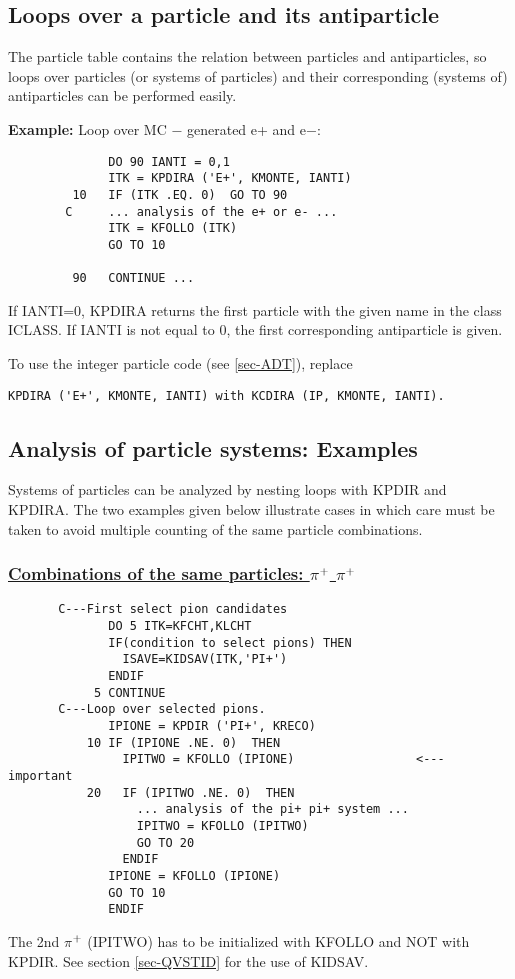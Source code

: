 \subsection{\label{sec-ADA}Loops over a particle and its antiparticle}
\par
The particle table contains the relation between particles and
antiparticles, so loops over particles (or systems of particles)
and their corresponding (systems of) antiparticles can be
performed easily.
\par
{\bf Example:} Loop over MC $-$ generated e+ and e$-$:
\begin{verbatim}
              DO 90 IANTI = 0,1
              ITK = KPDIRA ('E+', KMONTE, IANTI)
         10   IF (ITK .EQ. 0)  GO TO 90
        C     ... analysis of the e+ or e- ...
              ITK = KFOLLO (ITK)
              GO TO 10
 
         90   CONTINUE ...
\end{verbatim}
\begin{indentlist}{ 5.00cm}{ 5.25cm}
If IANTI=0, KPDIRA returns the first particle with the
given name in the class ICLASS.
If IANTI is not equal to 0, the first corresponding antiparticle
is given.
\end{indentlist}
To use the integer particle code (see \ref{sec-ADT}), replace
\begin{verbatim}
KPDIRA ('E+', KMONTE, IANTI) with KCDIRA (IP, KMONTE, IANTI).
\end{verbatim}
 
\subsection{\label{sec-ADS}Analysis of particle systems: Examples}
\par
Systems of particles can be analyzed by nesting loops with
KPDIR and KPDIRA. The two examples given below illustrate
cases in which care must be taken to avoid multiple counting of the
same
particle combinations.
 
\subsubsection{\underline {Combinations of the same particles: $\pi$$\sp{+}$
$\pi$$\sp{+}$}}
\par
\begin{verbatim}
       C---First select pion candidates
              DO 5 ITK=KFCHT,KLCHT
              IF(condition to select pions) THEN
                ISAVE=KIDSAV(ITK,'PI+')
              ENDIF
            5 CONTINUE
       C---Loop over selected pions.
              IPIONE = KPDIR ('PI+', KRECO)
           10 IF (IPIONE .NE. 0)  THEN
                IPITWO = KFOLLO (IPIONE)                 <--- important
           20   IF (IPITWO .NE. 0)  THEN
                  ... analysis of the pi+ pi+ system ...
                  IPITWO = KFOLLO (IPITWO)
                  GO TO 20
                ENDIF
              IPIONE = KFOLLO (IPIONE)
              GO TO 10
              ENDIF
\end{verbatim}
The 2nd $\pi$$\sp{+}$ (IPITWO) has to be initialized with KFOLLO and
NOT
with KPDIR. See section \ref{sec-QVSTID} for the use of KIDSAV.
